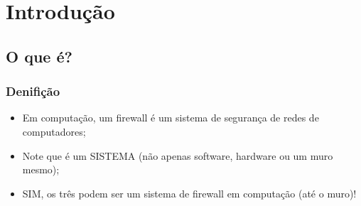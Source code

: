 \section{Introdução} 

\subsection{O que é?} %

\begin{frame}
	\frametitle{Denifição}

	\begin{itemize}
		\item Em computação, um firewall é um sistema de segurança de redes de computadores;
		\item Note que é um SISTEMA (não apenas software, hardware ou um muro mesmo);
		\item SIM, os três podem ser um sistema de firewall em computação (até o muro)!
	\end{itemize}

\end{frame}


